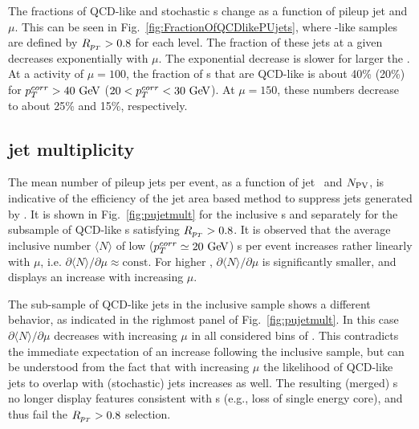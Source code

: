 The fractions of QCD-like and stochastic \pujet s change as a function of pileup jet \pt{} and $\mu$. This can be seen in Fig.~\ref{fig:FractionOfQCDlikePUjets}, where \qcdjet-like
samples are defined by $R_{p_T} > 0.8$ for each \pu{} level. The fraction of these jets at a given \ptcorr{} decreases exponentially with $\mu$.  The exponential decrease is slower for larger the \ptcorr. 
At a \pu{} activity of $\mu=100$, the fraction of \pujet{}s that are QCD-like is about 40\% (20\%) for $\ptcorr > 40\GeV$ ($20 < \ptcorr <30\GeV$). At  $\mu=150$, these numbers
decrease to about 25\% and 15\%, respectively. 
 


\subsection{\PU{} jet multiplicity}
The mean number of pileup jets per event, as a function of jet \ptcorr~and 
$N_{\rm PV}$, is indicative of the efficiency of the jet area based method to suppress jets generated by \pu. It is shown in Fig.~\ref{fig:pujetmult} for the inclusive \pujet s and separately for the subsample of QCD-like \pujet s satisfying $R_{p_T}  > 0.8$. It is observed that the average inclusive number $\langle N\rangle$ of low ($\ptcorr \simeq 20\GeV$) \pujet s per event increases rather linearly with $\mu$, i.e. $\partial \langle N \rangle/\partial \mu \approx \mathrm{const}$. For higher \pujet{} \pT, $\partial \langle N \rangle/\partial \mu$ is significantly smaller, and displays an increase with increasing $\mu$.

The sub-sample of QCD-like jets in the inclusive \pujet{} sample shows a different behavior, as indicated in the righmost panel of Fig.~\ref{fig:pujetmult}. In this case $\partial \langle N \rangle/\partial \mu$ decreases with increasing $\mu$ in all considered bins of \ptcorr. This contradicts the immediate expectation of an increase following the inclusive sample, but can be understood from the fact that with increasing $\mu$ the likelihood of QCD-like jets to overlap with (stochastic) jets increases as well. The resulting (merged) \pujet s no longer display features consistent with \qcdjet s (e.g., loss of single energy core), and thus fail the $R_{p_T} > 0.8$ selection.

